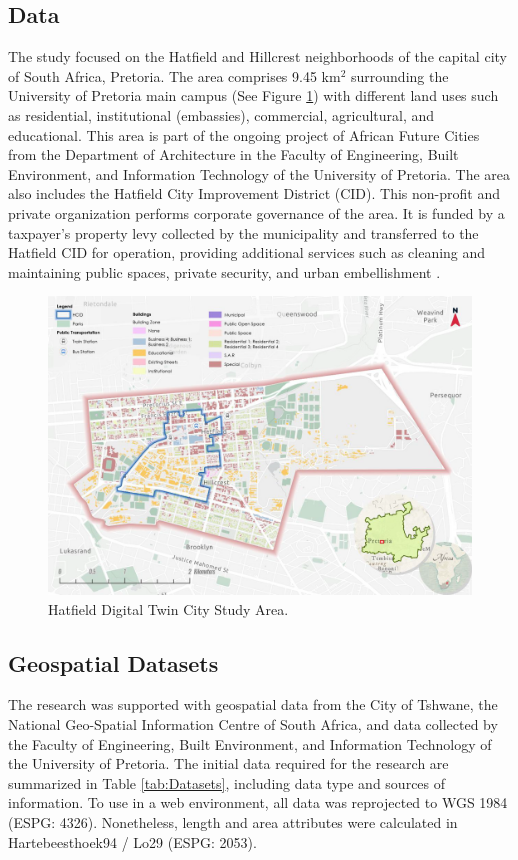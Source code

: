 \documentclass[authoryear,preprint,review,12pt]{elsarticle}
\begin{document}
    \subsection{Data} \label{subsec:Study Area}
    The study focused on the Hatfield and Hillcrest neighborhoods of the capital city of South Africa, Pretoria. The area comprises 9.45 km$^2$ surrounding the University of Pretoria main campus (See Figure \ref{fig:studyArea}) with different land uses such as residential, institutional (embassies), commercial, agricultural, and educational. This area is part of the ongoing project of African Future Cities from the Department of Architecture in the Faculty of Engineering, Built Environment, and Information Technology of the University of Pretoria. The area also includes the Hatfield City Improvement District (CID). This non-profit and private organization performs corporate governance of the area. It is funded by a taxpayer’s property levy collected by the municipality and transferred to the Hatfield CID for operation, providing additional services such as cleaning and maintaining public spaces, private security, and urban embellishment \citep{cidHatfieldCIDBrochure2021}.
    \begin{figure}[h]
        \centering
        \includegraphics[width=\linewidth]{studyAreaHatf.png}
        \caption{Hatfield Digital Twin City Study Area.}
        \label{fig:studyArea}
    \end{figure}
    \subsection{Geospatial Datasets} \label{subsec:Geospatial}
    The research was supported with geospatial data from the City of Tshwane, the National Geo-Spatial Information Centre of South Africa, and data collected by the Faculty of Engineering, Built Environment, and Information Technology of the University of Pretoria. The initial data required for the research are summarized in Table \ref{tab:Datasets}, including data type and sources of information. To use in a web environment, all data was reprojected to WGS 1984 (ESPG: 4326). Nonetheless, length and area attributes were calculated in Hartebeesthoek94 / Lo29 (ESPG: 2053).
\end{document}
